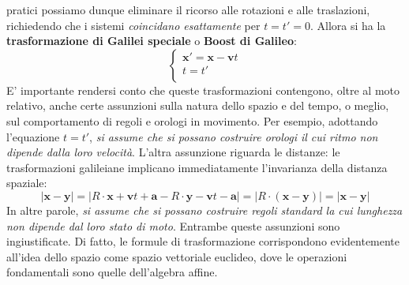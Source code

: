 \documentclass[a4paper,11pt]{book}
\theoremstyle{plain}
\theoremstyle{definition}
\begin{document}
pratici possiamo dunque eliminare il ricorso alle rotazioni e alle traslazioni, richiedendo che i sistemi 
\emph{coincidano esattamente} per $t=t'=0$. Allora si ha la \textbf{trasformazione di Galilei speciale} o \textbf{Boost di Galileo}: 
\begin{equation}
\begin{cases}
\textbf{x}'=\textbf{x}-\textbf{v}t \\
t=t' \\
\end{cases}
\end{equation}
E' importante rendersi conto che queste trasformazioni contengono, oltre al 
moto relativo, anche certe assunzioni sulla natura dello spazio e del tempo, o meglio, 
sul comportamento di regoli e orologi in movimento. Per esempio, adottando l'equazione $t=t'$, \emph{si assume che si possano costruire orologi il cui ritmo non dipende dalla loro 
velocità}. L'altra assunzione riguarda le distanze: le trasformazioni galileiane implicano 
immediatamente l'invarianza della distanza spaziale:
\[
|\textbf{x}-\textbf{y}|=|R\cdot \textbf{x}+\textbf{v}t+\textbf{a}-R\cdot\textbf{y}-\textbf{v}t-\textbf{a}|=|R\cdot(\textbf{x}-\textbf{y})|=|\textbf{x}-\textbf{y}|
\]  
In altre parole, \emph{si assume che si possano costruire regoli 
standard la cui lunghezza non dipende dal loro stato di moto}. Entrambe queste assunzioni 
sono ingiustificate. Di fatto, le formule di trasformazione corrispondono evidentemente all'idea dello spazio come spazio vettoriale euclideo, dove le operazioni fondamentali sono quelle dell'algebra affine. 
\end{document}

